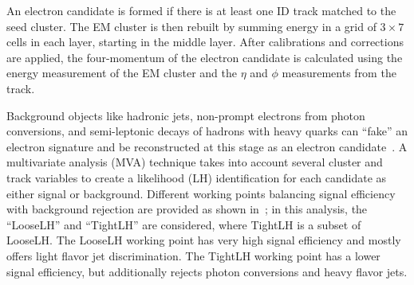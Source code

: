 An electron candidate is formed if there is at least one ID track matched to the seed cluster. The EM cluster is then rebuilt by summing energy in a grid of $3\times 7$ cells in each layer, starting in the middle layer. After calibrations and corrections are applied, the four-momentum of the electron candidate is calculated using the energy measurement of the EM cluster and the $\eta$ and $\phi$ measurements from the track.




Background objects like hadronic jets, non-prompt electrons from photon conversions, and semi-leptonic decays of hadrons with heavy quarks can ``fake'' an electron signature and be reconstructed at this stage as an electron candidate~\cite{electron_efficiency}. A multivariate analysis (MVA) technique takes into account several cluster and track variables to create a likelihood (LH) identification for each candidate as either signal or background. Different working points balancing signal efficiency with background rejection are provided as shown in~\Fig{\ref{fig:el_id_eff}}; in this analysis, the ``LooseLH'' and ``TightLH'' are considered, where TightLH is a subset of LooseLH. The LooseLH working point has very high signal efficiency and mostly offers light flavor jet discrimination. The TightLH working point has a lower signal efficiency, but additionally rejects photon conversions and heavy flavor jets.

